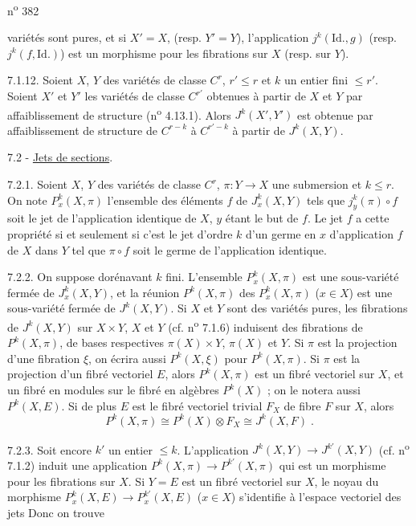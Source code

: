 \hfill n\textsuperscript{o} 382

variétés sont pures, et si $X'=X$, (resp. $Y'=Y$), l'application $j^k(\mathrm{Id}.,g)$ (resp. $j^k(f,\mathrm{Id}.)$) est un morphisme pour les fibrations sur $X$ (resp. sur $Y$).

7.1.12. Soient $X$, $Y$ des variétés de classe $C^r$, $r'\leq r$ et $k$ un entier fini $\leq r'$. Soient $X'$ et $Y'$ les variétés de classe $C^{r'}$ obtenues à partir de $X$ et $Y$ par affaiblissement de structure (n\textsuperscript{o} 4.13.1). Alors $J^k(X',Y')$ est obtenue par affaiblissement de structure de $C^{r-k}$ à $C^{r'-k}$ à partir de $J^k(X,Y)$.

7.2 - \uline{Jets de sections}.

7.2.1. Soient $X$, $Y$ des variétés de classe $C^r$, $\pi:Y\longrightarrow X$ une submersion et $k\leq r$. On note $P^k_x(X,\pi)$ l'ensemble des éléments $f$ de $J^k_x(X,Y)$ tels que $j^k_y(\pi)\circ f$ soit le jet de l'application identique de $X$, $y$ étant le but de $f$. Le jet $f$ a cette propriété si et seulement si c'est le jet d'ordre $k$ d'un germe en $x$ d'application $f$ de $X$ dans $Y$ tel que $\pi\circ f$ soit le germe de l'application identique.

7.2.2. On suppose dorénavant $k$ fini. L'ensemble $P^k_x(X,\pi)$ est une sous-variété fermée de $J^k_x(X,Y)$, et la réunion $P^k(X,\pi)$ des $P^k_x(X,\pi)$ ($x\in X$) est une sous-variété fermée de $J^k(X,Y)$. Si $X$ et $Y$ sont des variétés pures, les fibrations de $J^k(X,Y)$ sur $X\times Y$, $X$ et $Y$ (cf. n\textsuperscript{o} 7.1.6) induisent des fibrations de $P^k(X,\pi)$, de bases respectives $\pi(X)\times Y$, $\pi(X)$ et $Y$. Si $\pi$ est la projection d'une fibration $\xi$, on écrira aussi $P^k(X,\xi)$ pour $P^k(X,\pi)$. Si $\pi$ est la projection d'un fibré vectoriel $E$, alors $P^k(X,\pi)$ est un fibré vectoriel sur $X$, et un fibré en modules sur le fibré en algèbres $P^k(X)$ ; on le notera aussi $P^k(X,E)$. Si de plus $E$ est le fibré vectoriel trivial $F_X$ de fibre $F$ sur $X$, alors
\[
P^k(X,\pi)\cong P^k(X)\otimes F_X\cong J^k(X,F)\;.
\]

7.2.3. Soit encore $k'$ un entier $\leq k$. L'application $J^k(X,Y)\longrightarrow J^{k'}(X,Y)$ (cf. n\textsuperscript{o} 7.1.2) induit une application $P^k(X,\pi)\longrightarrow P^{k'}(X,\pi)$ qui est un morphisme pour les fibrations sur $X$. Si $Y=E$ est un fibré vectoriel sur $X$, le noyau du morphisme $P^k_x(X,E)\longrightarrow P^{k'}_x(X,E)$ ($x\in X$) s'identifie à l'espace vectoriel des jets
Donc  on trouve

